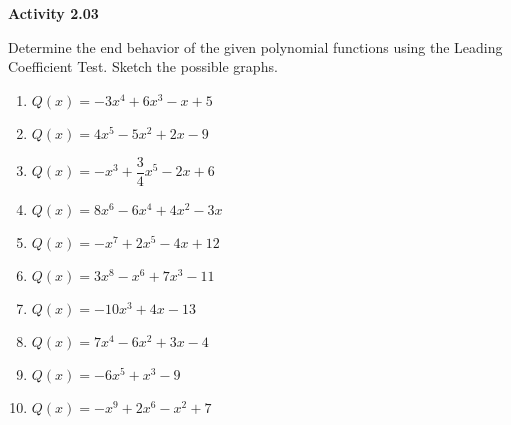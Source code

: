 \vspace{0.3ex}
\noindent\textbf{Activity 2.03}

\vspace{0.2ex}

Determine the end behavior of the given polynomial functions using the Leading Coefficient Test. Sketch the possible graphs.
\begin{multicols}{2}
\begin{enumerate}
    \item \( Q(x) = -3x^4 + 6x^3 - x + 5 \)
    \item \( Q(x) = 4x^5 - 5x^2 + 2x - 9 \)
    \item \( Q(x) = -x^3 + \dfrac{3}{4}x^5 - 2x + 6 \)
    \item \( Q(x) = 8x^6 - 6x^4 + 4x^2 - 3x \)
    \item \( Q(x) = -x^7 + 2x^5 - 4x + 12 \)
    \item \( Q(x) = 3x^8 - x^6 + 7x^3 - 11 \)
    \item \( Q(x) = -10x^3 + 4x - 13 \)
    \item \( Q(x) = 7x^4 - 6x^2 + 3x - 4 \)
    \item \( Q(x) = -6x^5 + x^3 - 9 \)
    \item \( Q(x) = -x^9 + 2x^6 - x^2 + 7 \)
\end{enumerate}
\end{multicols}
